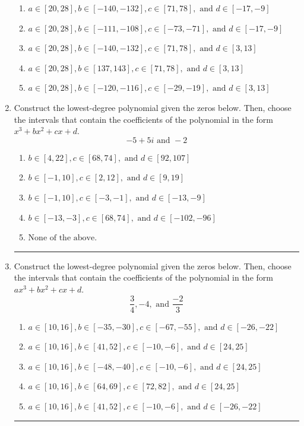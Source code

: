 \documentclass[14pt]{extbook}
\newcommand{\litem}[1]{\item#1\hspace*{-1cm}\rule{\textwidth}{0.4pt}}
\begin{document}
\begin{enumerate}
{\begin{enumerate}[label=\Alph*.]
\item \( a \in [20, 28], b \in [-140, -132], c \in [71, 78], \text{ and } d \in [-17, -9] \)
\item \( a \in [20, 28], b \in [-111, -108], c \in [-73, -71], \text{ and } d \in [-17, -9] \)
\item \( a \in [20, 28], b \in [-140, -132], c \in [71, 78], \text{ and } d \in [3, 13] \)
\item \( a \in [20, 28], b \in [137, 143], c \in [71, 78], \text{ and } d \in [3, 13] \)
\item \( a \in [20, 28], b \in [-120, -116], c \in [-29, -19], \text{ and } d \in [3, 13] \)

\end{enumerate} }
\litem{
Construct the lowest-degree polynomial given the zeros below. Then, choose the intervals that contain the coefficients of the polynomial in the form $x^3+bx^2+cx+d$.\[ -5 + 5 i \text{ and } -2 \]\begin{enumerate}[label=\Alph*.]
\item \( b \in [4, 22], c \in [68, 74], \text{ and } d \in [92, 107] \)
\item \( b \in [-1, 10], c \in [2, 12], \text{ and } d \in [9, 19] \)
\item \( b \in [-1, 10], c \in [-3, -1], \text{ and } d \in [-13, -9] \)
\item \( b \in [-13, -3], c \in [68, 74], \text{ and } d \in [-102, -96] \)
\item \( \text{None of the above.} \)

\end{enumerate} }
\litem{
Construct the lowest-degree polynomial given the zeros below. Then, choose the intervals that contain the coefficients of the polynomial in the form $ax^3+bx^2+cx+d$.\[ \frac{3}{4}, -4, \text{ and } \frac{-2}{3} \]\begin{enumerate}[label=\Alph*.]
\item \( a \in [10, 16], b \in [-35, -30], c \in [-67, -55], \text{ and } d \in [-26, -22] \)
\item \( a \in [10, 16], b \in [41, 52], c \in [-10, -6], \text{ and } d \in [24, 25] \)
\item \( a \in [10, 16], b \in [-48, -40], c \in [-10, -6], \text{ and } d \in [24, 25] \)
\item \( a \in [10, 16], b \in [64, 69], c \in [72, 82], \text{ and } d \in [24, 25] \)
\item \( a \in [10, 16], b \in [41, 52], c \in [-10, -6], \text{ and } d \in [-26, -22] \)

\end{enumerate} }
\end{enumerate}
\end{document}
